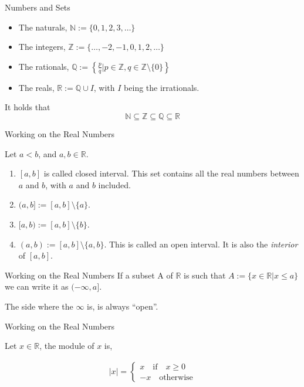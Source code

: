 \documentclass[aspectratio=169]{beamer}
\begin{document}
\begin{frame}{Numbers and Sets}
    \begin{itemize}
        \item The naturals, $\mathbb{N}:=\{0,1,2,3,\ldots\}$
        \item The integers, $\mathbb{Z}:=\{\ldots,-2,-1,0,1,2,\ldots\}$
        \item The rationals, $\mathbb{Q}:=\left\{\frac{p}{q}|p\in\mathbb{Z},q\in\mathbb{Z}\setminus\{0\}\right\}$
        \item The reals, $\mathbb{R}:=\mathbb{Q}\cup I$, with $I$ being the irrationals.
    \end{itemize}
    
    It holds that $$\mathbb{N}\subseteq\mathbb{Z}\subseteq\mathbb{Q}\subseteq\mathbb{R}$$
    
\end{frame}

\begin{frame}{Working on the Real Numbers}

Let $a<b$, and $a,b\in \mathbb{R}$.

\begin{enumerate}
    \item $[a,b]$ is called closed interval. This set contains all the real numbers between $a$ and $b$, with $a$ and $b$ included.
    \item $(a,b]:=[a,b]\setminus\{a\}$.
    \item $[a,b):=[a,b]\setminus\{b\}$.
    \item $(a,b):=[a,b]\setminus\{a,b\}$. This is called an open interval. It is also the \emph{interior} of $[a,b]$.
\end{enumerate}
    
\end{frame}

\begin{frame}{Working on the Real Numbers}
    If a subset A of $\mathbb{R}$ is such that $A:=\{x\in\mathbb{R}|x\leq a\}$ we can write it as $(-\infty,a]$.
    
    \vspace{1cm}
    
    The side where the $\infty$ is, is always ``open''.
\end{frame}

\begin{frame}{Working on the Real Numbers}
    \begin{definition}
        Let $x\in\mathbb{R}$, the module of $x$ is,
        
        \begin{eqnarray*}
            |x|=\left\{
                \begin{array}{c}
                   x \quad \text{if} \quad x\geq 0\\
                  -x \quad \text{otherwise}
            \end{array}
            \right.
        \end{eqnarray*}
    \end{definition}

\end{frame}
\end{document}
